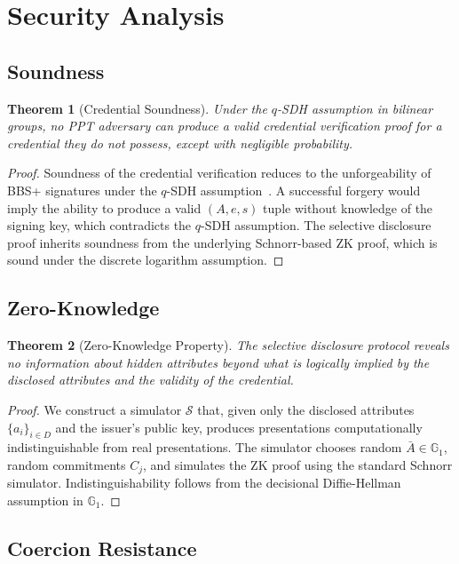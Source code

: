 \documentclass[11pt,a4paper]{article}
\newcommand{\GG}{\mathbb{G}}
\newtheorem{theorem}{Theorem}
\begin{document}
\section{Security Analysis}

\subsection{Soundness}

\begin{theorem}[Credential Soundness]
Under the $q$-SDH assumption in bilinear groups, no PPT adversary can produce a valid credential verification proof for a credential they do not possess, except with negligible probability.
\end{theorem}

\begin{proof}
Soundness of the credential verification reduces to the unforgeability of BBS+ signatures under the $q$-SDH assumption~\citep{boneh2004bbs}. A successful forgery would imply the ability to produce a valid $(A, e, s)$ tuple without knowledge of the signing key, which contradicts the $q$-SDH assumption. The selective disclosure proof inherits soundness from the underlying Schnorr-based ZK proof, which is sound under the discrete logarithm assumption.
\end{proof}

\subsection{Zero-Knowledge}

\begin{theorem}[Zero-Knowledge Property]
The selective disclosure protocol reveals no information about hidden attributes beyond what is logically implied by the disclosed attributes and the validity of the credential.
\end{theorem}

\begin{proof}
We construct a simulator $\mathcal{S}$ that, given only the disclosed attributes $\{a_i\}_{i \in D}$ and the issuer's public key, produces presentations computationally indistinguishable from real presentations. The simulator chooses random $\bar{A} \in \GG_1$, random commitments $C_j$, and simulates the ZK proof using the standard Schnorr simulator. Indistinguishability follows from the decisional Diffie-Hellman assumption in $\GG_1$.
\end{proof}

\subsection{Coercion Resistance}
\end{document}
